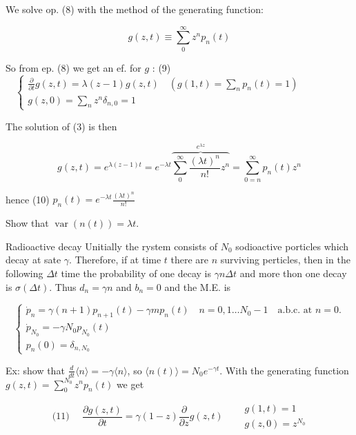 We solve op. (8) with the method of the generating function:

$$ 
 g(z, t) \equiv \sum_{0}^{\infty} z^{n} p_{n}(t)
$$ 

So from ep. (8) we get an ef. for $g$ :
(9) $\quad\left\{\begin{array}{l}\frac{\partial}{\partial t} g(z, t)=\lambda(z-1) g(z, t) \quad\left(g(1, t)=\sum_{n} p_{n}(t)=1\right) \\ g(z, 0)=\sum_{n} z^{n} \delta_{n, 0}=1\end{array}\right.$

The solution of (3) is then


\begin{equation*}
 g(z, t)=e^{\lambda(z-1) t}=e^{-\lambda t} \overbrace{\sum_{0}^{\infty} \frac{(\lambda t)^{n}}{n!} z^{n}}^{e^{\lambda z}}=\sum_{0=n}^{\infty} p_{n}(t) z^{n} \tag{8}
\end{equation*}


hence
(10) $p_{n}(t)=e^{-\lambda t} \frac{(\lambda t)^{n}}{n!}$

Show that $\operatorname{var}(n(t))=\lambda t$.

Radioactive decay
Unitially the rystem consists of $N_{0}$ sodioactive porticles which decay at sate $\gamma$. Therefore, if at time $t$ there are $n$ surviving perticles, then in the following $\Delta t$ time the probability of one decay is $\gamma n \Delta t$ and more thon one decay is $\sigma(\Delta t)$. Thus $d_{n}=\gamma n$ and $b_{n}=0$ and the M.E. is

$$ 
\left\{\begin{array}{l}\dot{p}_{n}=\gamma(n+1) p_{n+1}(t)-\gamma m p_{n}(t) \quad n=0,1 \ldots N_{0}-1 \quad \text{a.b.c. at } n=0 . \\ \dot{p}_{N_{0}}=-\gamma N_{0} p_{N_{0}}(t) \\ p_{n}(0)=\delta_{n, N_{0}}\end{array}\right.
$$ 

Ex: show that $\frac{d}{d t}\langle n\rangle=-\gamma\langle n\rangle$, so $\langle n(t)\rangle=N_{0} e^{-\gamma t}$.
With the generating function $g(z, t)=\sum_{0}^{N_{0}} z^{n} p_{n}(t)$ we get

$$ 
 \text { (11) } \quad \frac{\partial g(z, t)}{\partial t}=\gamma(1-z) \frac{\partial}{\partial z} g(z, t) \quad \begin{aligned} & g(1, t)=1 \\ & g(z, 0)=z^{N_{0}} \end{aligned}
$$ 

